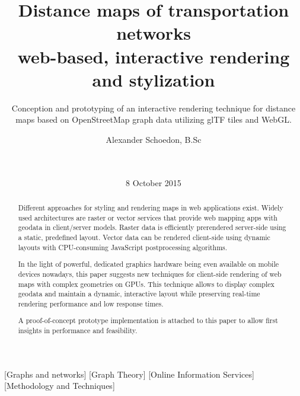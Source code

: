 \documentclass{motivation}
\begin{document}

\title{Distance maps of transportation networks\\ {\ttlit web-based, interactive rendering and stylization}}

\subtitle{Conception and prototyping of an interactive rendering technique for distance maps based on OpenStreetMap graph data utilizing glTF tiles and WebGL.}


\author{
  \alignauthor
  Alexander Schoedon, B.Sc\\
         \\
         \\
}

\date{8 October 2015}

\maketitle
{}

\begin{abstract}
  Different approaches for styling and rendering maps in web applications exist. Widely used architectures are raster or vector services that provide web mapping apps with geodata in client/server models. Raster data is efficiently prerendered server-side using a static, predefined layout. Vector data can be rendered client-side using dynamic layouts with CPU-consuming JavaScript postprocessing algorithms.\par
  In the light of powerful, dedicated graphics hardware being even available on mobile devices nowadays, this paper suggests new techniques for client-side rendering of web maps with complex geometries on GPUs. This technique allows to display complex geodata and maintain a dynamic, interactive layout while preserving real-time rendering performance and low response times.\par
  A proof-of-concept prototype implementation is attached to this paper to allow first insights in performance and feasibility.
\end{abstract}

[Graphs and networks]
[Graph Theory]
[Online Information Services]
[Methodology and Techniques]
\end{document}
